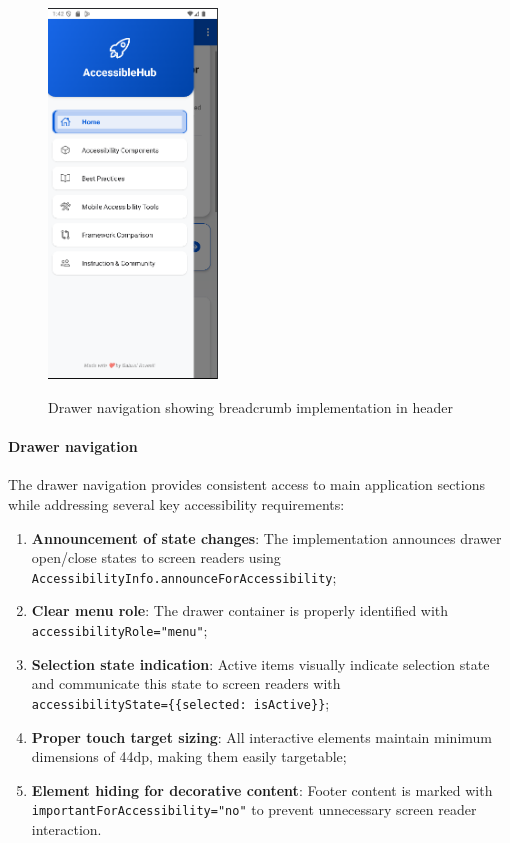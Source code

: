 \begin{figure}[ht]
    \centering
    \includegraphics[width=0.4\textwidth, alt={Drawer navigation with breadcrumb in header}]{img/drawer.png}
    \caption{Drawer navigation showing breadcrumb implementation in header}\label{fig:drawer-navigation}
\end{figure}

\paragraph{Drawer navigation}

The drawer navigation provides consistent access to main application sections while addressing several key accessibility requirements:

\begin{enumerate}
    \item \textbf{Announcement of state changes}: The implementation announces drawer open/close states to screen readers using \\ \texttt{AccessibilityInfo.announceForAccessibility};
    
    \item \textbf{Clear menu role}: The drawer container is properly identified with \\ \texttt{accessibilityRole="menu"};
    
    \item \textbf{Selection state indication}: Active items visually indicate selection state and communicate this state to screen readers with \\ \texttt{accessibilityState=\{\{selected: isActive\}\}};
    
    \item \textbf{Proper touch target sizing}: All interactive elements maintain minimum dimensions of 44dp, making them easily targetable;
    
    \item \textbf{Element hiding for decorative content}: Footer content is marked with \\\texttt{importantForAccessibility="no"} to prevent unnecessary screen reader interaction.
\end{enumerate}

